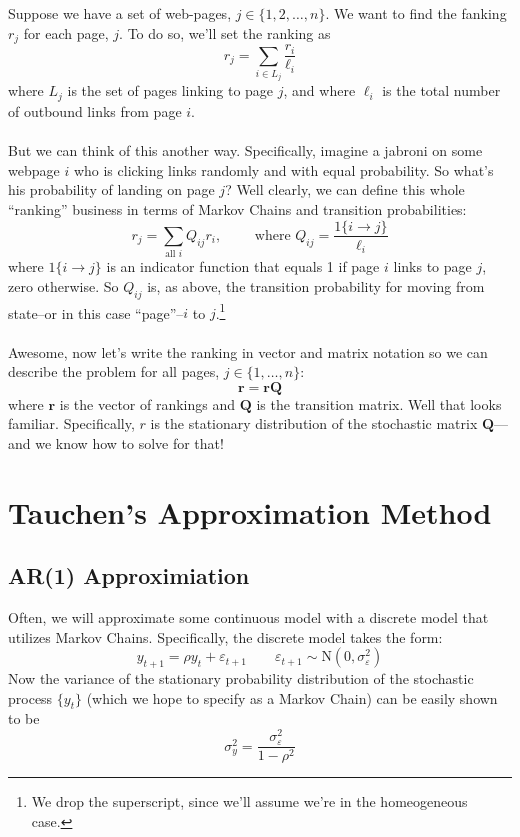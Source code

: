 \documentclass[a4paper,12pt]{scrartcl}
\begin{document}
Suppose we have a set of web-pages, $j \in \{1, 2, \dots,n \}$.
We want to find the fanking $r_j$ for each page, $j$. To do 
so, we'll set the ranking as
    \[ r_j = \sum_{i \in L_j} \frac{r_i}{\ell_i} \]
where $L_j$ is the set of pages linking to page $j$, and
where $\ell_i$ is the total number of outbound links from 
page $i$. 
\\
\\
But we can think of this another way.  Specifically, imagine
a jabroni on some webpage $i$ who is clicking links randomly
and with equal probability.  So what's his probability of 
landing on page $j$?  Well clearly, we can define this whole
``ranking'' business in terms of Markov Chains and transition
probabilities:
    \[ r_j = \sum_{\text{all $i$}} Q_{ij} r_i, \qquad
	\text{ where  } Q_{ij} = \frac{1\{i \rightarrow j\}}{\ell_i}
    \]
where $1\{i \rightarrow j\}$ is an indicator function that 
equals 1 if page $i$ links to page $j$, zero otherwise.
So $Q_{ij}$ is, as above, the transition probability for
moving from state--or in this case ``page''--$i$ to 
$j$.\footnote{We drop the superscript, since we'll assume 
we're in the homeogeneous case.}
\\
\\
Awesome, now let's write the ranking in vector and matrix 
notation so we can describe the problem for all pages,
$j \in \{1, \ldots, n\}$:
    \[ \mathbf{r} = \mathbf{r} \mathbf{Q} \]
where $\mathbf{r}$ is the vector of rankings and $\mathbf{Q}$
is the transition matrix.  Well that looks familiar.  
Specifically, $r$ is the stationary distribution of the
stochastic matrix $\mathbf{Q}$---and we know how to solve for
that!


\newpage
\section{Tauchen's Approximation Method}

\subsection{AR(1) Approximiation}
Often, we will approximate some continuous model with a 
discrete model that utilizes Markov Chains. Specifically, the
discrete model takes the form:
\begin{equation}
    y_{t+1} = \rho y_t + \varepsilon_{t+1} \qquad 
	\varepsilon_{t+1} \sim \text{N}(0, \sigma_\varepsilon^2)
\end{equation}
Now the variance of the stationary probability distribution 
of the stochastic process $\{y_t\}$ (which we hope to specify
as a Markov Chain) can be easily shown to be
    \[ \sigma_y^2 = \frac{\sigma^2_\varepsilon}{1-\rho^2} \]
\end{document}
